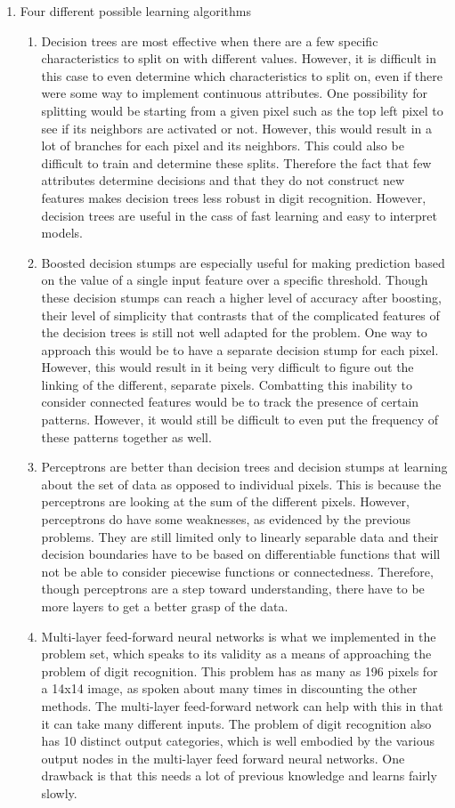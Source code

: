 \documentclass[11pt]{article}
\begin{document}
\begin{enumerate}
\begin{enumerate}
	\end{enumerate}
\item Four different possible learning algorithms
	\begin{enumerate}
	\item Decision trees are most effective when there are a few specific characteristics to split on with different values. However, it is difficult in this case to even determine which characteristics to split on, even if there were some way to implement continuous attributes. One possibility for splitting would be starting from a given pixel such as the top left pixel to see if its neighbors are activated or not. However, this would result in a lot of branches for each pixel and its neighbors. This could also be difficult to train and determine these splits. Therefore the fact that few attributes determine decisions and that they do not construct new features makes decision trees less robust in digit recognition. However, decision trees are useful in the cass of fast learning and easy to interpret models.
	\item Boosted decision stumps are especially useful for making prediction based on the value of a single input feature over a specific threshold. Though these decision stumps can reach a higher level of accuracy after boosting, their level of simplicity that contrasts that of the complicated features of the decision trees is still not well adapted for the problem. One way to approach this would be to have a separate decision stump for each pixel. However, this would result in it being very difficult to figure out the linking of the different, separate pixels. Combatting this inability to consider connected features would be to track the presence of certain patterns. However, it would still be difficult to even put the frequency of these patterns together as well.
	\item Perceptrons are better than decision trees and decision stumps at learning about the set of data as opposed to individual pixels. This is because the perceptrons are looking at the sum of the different pixels. However, perceptrons do have some weaknesses, as evidenced by the previous problems. They are still limited only to linearly separable data and their decision boundaries have to be based on differentiable functions that will not be able to consider piecewise functions or connectedness. Therefore, though perceptrons are a step toward understanding, there have to be more layers to get a better grasp of the data. 
	\item Multi-layer feed-forward neural networks is what we implemented in the problem set, which speaks to its validity as a means of approaching the problem of digit recognition. This problem has as many as 196 pixels for a 14x14 image, as spoken about many times in discounting the other methods. The multi-layer feed-forward network can help with this in that it can take many different inputs. The problem of digit recognition also has 10 distinct output categories, which is well embodied by the various output nodes in the multi-layer feed forward neural networks. One drawback is that this needs a lot of previous knowledge and learns fairly slowly.

\end{enumerate}
\end{enumerate}
\end{document}
